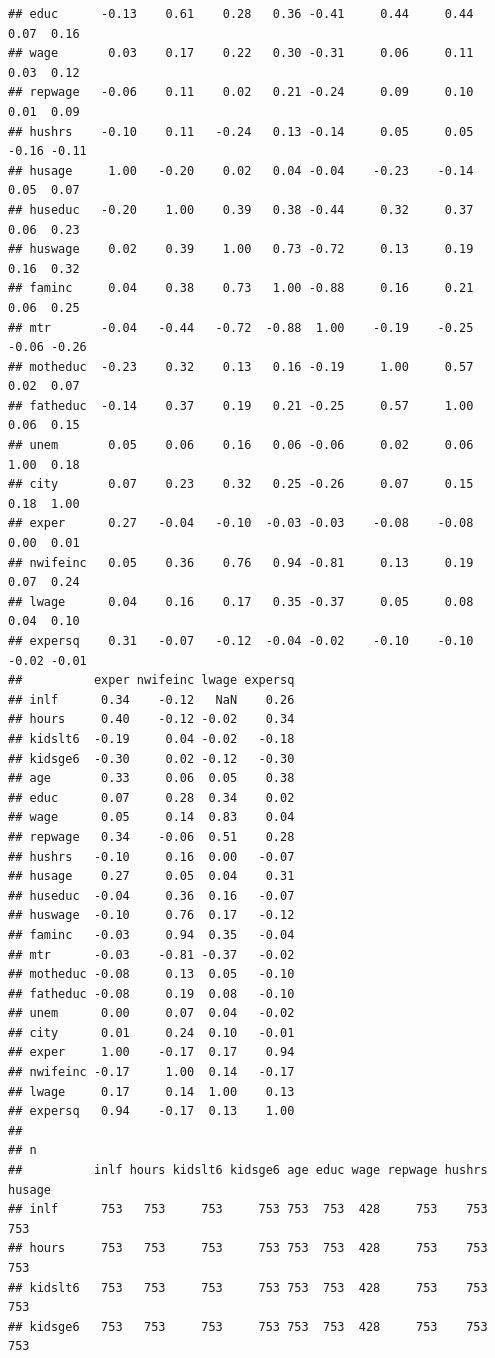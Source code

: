 \documentclass[]{book}
\begin{document}
\begin{verbatim}
## educ      -0.13    0.61    0.28   0.36 -0.41     0.44     0.44  0.07  0.16
## wage       0.03    0.17    0.22   0.30 -0.31     0.06     0.11  0.03  0.12
## repwage   -0.06    0.11    0.02   0.21 -0.24     0.09     0.10  0.01  0.09
## hushrs    -0.10    0.11   -0.24   0.13 -0.14     0.05     0.05 -0.16 -0.11
## husage     1.00   -0.20    0.02   0.04 -0.04    -0.23    -0.14  0.05  0.07
## huseduc   -0.20    1.00    0.39   0.38 -0.44     0.32     0.37  0.06  0.23
## huswage    0.02    0.39    1.00   0.73 -0.72     0.13     0.19  0.16  0.32
## faminc     0.04    0.38    0.73   1.00 -0.88     0.16     0.21  0.06  0.25
## mtr       -0.04   -0.44   -0.72  -0.88  1.00    -0.19    -0.25 -0.06 -0.26
## motheduc  -0.23    0.32    0.13   0.16 -0.19     1.00     0.57  0.02  0.07
## fatheduc  -0.14    0.37    0.19   0.21 -0.25     0.57     1.00  0.06  0.15
## unem       0.05    0.06    0.16   0.06 -0.06     0.02     0.06  1.00  0.18
## city       0.07    0.23    0.32   0.25 -0.26     0.07     0.15  0.18  1.00
## exper      0.27   -0.04   -0.10  -0.03 -0.03    -0.08    -0.08  0.00  0.01
## nwifeinc   0.05    0.36    0.76   0.94 -0.81     0.13     0.19  0.07  0.24
## lwage      0.04    0.16    0.17   0.35 -0.37     0.05     0.08  0.04  0.10
## expersq    0.31   -0.07   -0.12  -0.04 -0.02    -0.10    -0.10 -0.02 -0.01
##          exper nwifeinc lwage expersq
## inlf      0.34    -0.12   NaN    0.26
## hours     0.40    -0.12 -0.02    0.34
## kidslt6  -0.19     0.04 -0.02   -0.18
## kidsge6  -0.30     0.02 -0.12   -0.30
## age       0.33     0.06  0.05    0.38
## educ      0.07     0.28  0.34    0.02
## wage      0.05     0.14  0.83    0.04
## repwage   0.34    -0.06  0.51    0.28
## hushrs   -0.10     0.16  0.00   -0.07
## husage    0.27     0.05  0.04    0.31
## huseduc  -0.04     0.36  0.16   -0.07
## huswage  -0.10     0.76  0.17   -0.12
## faminc   -0.03     0.94  0.35   -0.04
## mtr      -0.03    -0.81 -0.37   -0.02
## motheduc -0.08     0.13  0.05   -0.10
## fatheduc -0.08     0.19  0.08   -0.10
## unem      0.00     0.07  0.04   -0.02
## city      0.01     0.24  0.10   -0.01
## exper     1.00    -0.17  0.17    0.94
## nwifeinc -0.17     1.00  0.14   -0.17
## lwage     0.17     0.14  1.00    0.13
## expersq   0.94    -0.17  0.13    1.00
## 
## n
##          inlf hours kidslt6 kidsge6 age educ wage repwage hushrs husage
## inlf      753   753     753     753 753  753  428     753    753    753
## hours     753   753     753     753 753  753  428     753    753    753
## kidslt6   753   753     753     753 753  753  428     753    753    753
## kidsge6   753   753     753     753 753  753  428     753    753    753

\end{verbatim}
\end{document}
